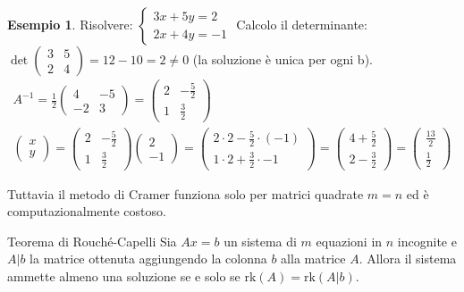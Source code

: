 \documentclass[a4paper]{article}
\theoremstyle{definition}
\newtheorem*{es}{Esempio}
\begin{document}
	\begin{es}
		Risolvere: $\begin{cases}
			3x + 5y = 2 \\
			2x + 4y = -1
		\end{cases}$
		Calcolo il determinante: $\det \begin{pmatrix}
			3 & 5 \\
			2 & 4
		\end{pmatrix} = 12 - 10 = 2 \ne 0$ (la soluzione è unica per ogni b).
		\begin{align*}
			A^{-1} = \frac{1}{2} \begin{pmatrix}
				4 & -5 \\
				-2 & 3
			\end{pmatrix} = \begin{pmatrix}
				2 & -\frac{5}{2} \\
				1 & \frac{3}{2}
			\end{pmatrix} \\
			\begin{pmatrix}
				x \\
				y
			\end{pmatrix} = \begin{pmatrix}
				2 & -\frac{5}{2} \\
				1 & \frac{3}{2}
			\end{pmatrix} \begin{pmatrix}
				2 \\
				- 1
			\end{pmatrix} = \begin{pmatrix}
				2 \cdot 2 - \frac{5}{2} \cdot ( - 1) \\
				1 \cdot 2 + \frac{3}{2} \cdot - 1
			\end{pmatrix} = \begin{pmatrix}
				4 + \frac{5}{2} \\
				2 - \frac{3}{2}
			\end{pmatrix} = \begin{pmatrix}
				\frac{13}{2} \\
				\frac{1}{2}
			\end{pmatrix}
		\end{align*}
	\end{es}
	Tuttavia il metodo di Cramer funziona solo per matrici quadrate $m = n$ ed è computazionalmente costoso.
	\begin{teo}{Teorema di Rouché-Capelli}{}
		Sia $Ax = b$ un sistema di $m$ equazioni in $n$ incognite e $A|b$ la matrice ottenuta aggiungendo la colonna $b$ alla matrice $A$.
		Allora il sistema ammette almeno una soluzione se e solo se $\text{rk}(A) = \text{rk}(A|b)$.
	\end{teo}
\end{document}
